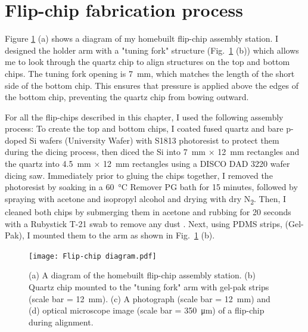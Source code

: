 \documentclass[double,12pt,1in,seploa]{beavtex}
\let\Oldsection\section
\renewcommand{\section}{\FloatBarrier\Oldsection}
\begin{document}
\section{Flip-chip fabrication process} \label{FCfab}
Figure \ref{flip-chip diagram} (a) shows a diagram of my homebuilt flip-chip assembly station. I designed the holder arm with a "tuning fork" structure (Fig.\ \ref{flip-chip diagram} (b)) which allows me to look through the quartz chip to align structures on the top and bottom chips. The tuning fork opening is \SI{7}{\milli\meter}, which matches the length of the short side of the bottom chip. This ensures that pressure is applied above the edges of the bottom chip, preventing the quartz chip from bowing outward. 

For all the flip-chips described in this chapter, I used the following assembly process: To create the top and bottom chips, I coated fused quartz and bare p-doped Si wafers (University Wafer) with S1813 photoresist to protect them during the dicing process, then diced the Si into \SI{7}{\milli\meter} $\times$ \SI{12}{\milli\meter} rectangles and the quartz into \SI{4.5}{\milli\meter} $\times$ \SI{12}{\milli\meter} rectangles using a DISCO DAD 3220 wafer dicing saw. Immediately prior to gluing the chips together, I removed the photoresist by soaking in a \SI{60}{\celsius} Remover PG bath for 15 minutes, followed by spraying with acetone and isopropyl alcohol and drying with dry N\textsubscript{2}. Then, I cleaned both chips by submerging them in acetone and rubbing for 20 seconds with a Rubystick T-21 swab to remove any dust \cite{lane_integrating_2021}. Next, using PDMS strips, (Gel-Pak), I mounted them to the arm as shown in Fig.\ \ref{flip-chip diagram} (b). 

\begin{figure}
    \texttt{[image: Flip-chip diagram.pdf]}
    \caption{(a) A diagram of the homebuilt flip-chip assembly station. (b) Quartz chip mounted to the "tuning fork" arm with gel-pak strips (scale bar = \SI{12}{\milli\meter}). (c) A photograph (scale bar = \SI{12}{\milli\meter}) and (d) optical microscope image (scale bar = \SI{350}{\micro\meter}) of a flip-chip during alignment.}
    \label{flip-chip diagram}
\end{figure}
\end{document}

